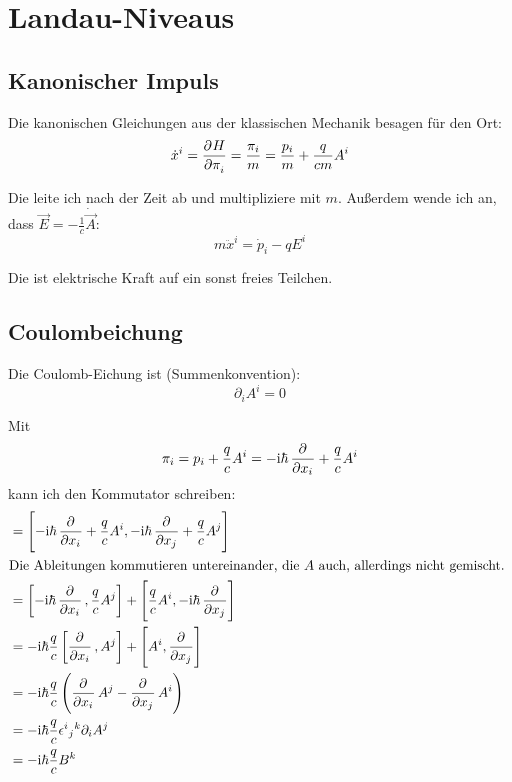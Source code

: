 
\section{Landau-Niveaus}

\subsection{Kanonischer Impuls}

Die kanonischen Gleichungen aus der klassischen Mechanik besagen für den Ort:
\[
	\dot x^i = \dpd H{\pi_i} = \frac{\pi_i}m = \frac{p_i}m + \frac q{cm} A^i
\]

Die leite ich nach der Zeit ab und multipliziere mit $m$. Außerdem wende ich
an, dass $\vec E = - \frac 1c \dot{\vec A}$:
\[
	m \ddot x^i = \dot p_i - q E^i
\]

Die ist elektrische Kraft auf ein sonst freies Teilchen.

\subsection{Coulombeichung}

Die Coulomb-Eichung ist (Summenkonvention):
\[
	\partial_i A^i = 0
\]

Mit
\[
	\pi_i = p_i + \frac qc A^i
	= - \ii \hbar \dpd{}{{x_i}} + \frac qc A^i
\]
kann ich den Kommutator schreiben:
\begin{align*}
	[\pi_i, \pi_j]
	&= \sbr{-\ii \hbar \dpd{}{{x_i}} + \frac qc A^i, -\ii \hbar \dpd{}{{x_j}} + \frac qc A^j} \\
	\intertext{%
		Die Ableitungen kommutieren untereinander, die $A$ auch, allerdings
		nicht gemischt.
	}
	&= \sbr{-\ii \hbar \dpd{}{{x_i}}, \frac qc A^j} + \sbr{\frac qc A^i, -\ii \hbar \dpd{}{{x_j}}} \\
	&= -\ii \hbar \frac qc \sbr{\dpd{}{{x_i}}, A^j} + \sbr{A^i, \dpd{}{{x_j}}} \\
	&= - \ii \hbar \frac qc \del{\dpd{}{{x_i}} A^j - \dpd{}{{x_j}} A^i} \\
	&= - \ii \hbar \frac qc \epsilon^i{}_j{}^k \partial_i A^j \\
	&= - \ii \hbar \frac qc B^k
\end{align*}


